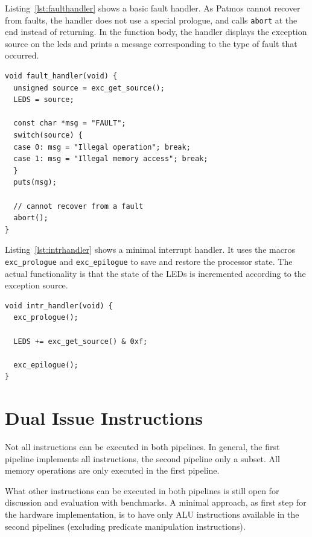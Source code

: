 \documentclass[a4paper,fontsize=10pt,twoside,DIV15,BCOR12mm,headinclude=true,footinclude=false,pagesize,bibtotoc]{scrbook}
\begin{document}
Listing~\ref{lst:faulthandler} shows a basic fault handler. As Patmos
cannot recover from faults, the handler does not use a special
prologue, and calls \texttt{abort} at the end instead of returning. In
the function body, the handler displays the exception source on the
leds and prints a message corresponding to the type of fault that
occurred.

\begin{lstlisting}[float, caption={Fault handler example\label{lst:faulthandler}}]
void fault_handler(void) {
  unsigned source = exc_get_source();
  LEDS = source;

  const char *msg = "FAULT";
  switch(source) {
  case 0: msg = "Illegal operation"; break;
  case 1: msg = "Illegal memory access"; break;
  }
  puts(msg);

  // cannot recover from a fault
  abort();
}
\end{lstlisting}

Listing~\ref{lst:intrhandler} shows a minimal interrupt handler. It
uses the macros \texttt{exc\_prologue} and \texttt{exc\_epilogue} to
save and restore the processor state. The actual functionality is that
the state of the LEDs is incremented according to the exception source.

\begin{lstlisting}[float, caption={Interrupt handler example\label{lst:intrhandler}}]
void intr_handler(void) {
  exc_prologue();

  LEDS += exc_get_source() & 0xf;

  exc_epilogue();
}
\end{lstlisting}


\clearpage
\section{Dual Issue Instructions}

Not all instructions can be executed in both pipelines. In general, the first
pipeline implements all instructions, the second pipeline only a subset.
All memory operations are only executed in the first pipeline.

What other instructions can be executed in both pipelines is still open for
discussion and evaluation with benchmarks. A minimal approach, as first
step for the hardware implementation, is to have only ALU instructions
available in the second pipelines (excluding predicate manipulation instructions).
\end{document}
